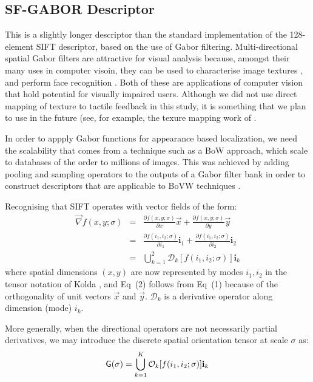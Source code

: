 \subsection{SF-GABOR Descriptor}
This is a slightly longer descriptor than the standard implementation of the 128-element SIFT descriptor, based on the use of Gabor filtering.  Multi-directional spatial Gabor filters are attractive for visual analysis because, amongst their many uses in computer visoin, they can be used to characterise image textures \citep{jain1990unsupervised,weldon1996efficient,adi2009texture}, and perform face recognition \citep{yang2013gabor}. Both of these are applications of computer vision that hold potential for visually impaired users. Although we did not use direct mapping of texture to tactile feedback in this study, it is something that we plan to use in the future (see, for example, the texure mapping work of \cite{adi2009texture}. 

In order to appply Gabor functions for appearance based localization, we need the scalability that comes from a technique such as a BoW approach, which scale to databases of the order to millions of images. This was achieved by adding pooling and sampling operators to the outputs of a Gabor filter bank in order to construct descriptors that are applicable to BoVW techniques \citep{nister2006scalable}.  

Recognising that SIFT operates with vector fields of the form:
\begin{eqnarray}
\vec{\nabla} f(x,y;\sigma) &=& \frac{\partial f(x,y;\sigma)}{\partial x}\vec{x} + \frac{\partial f(x,y;\sigma)}{\partial y}\vec{y}\nonumber \\
&=& \frac{\partial f(i_1,i_2;\sigma)}{\partial i_1}\mathbf{i}_1 + \frac{\partial f(i_1,i_2;\sigma)}{\partial i_2}\mathbf{i}_2\\
&=& \bigcup_{k=1}^2 \mathcal{D}_k [ f(i_1,i_2;\sigma) ] \mathbf{i}_k 
\end{eqnarray}
where spatial dimensions $(x,y)$ are now represented by modes $i_1,i_2$ in the tensor notation of Kolda \citep{kolda2009tensor}, and Eq~(2) follows from Eq~(1) because of the orthogonality of unit vectors $\vec{x}$ and $\vec{y}$.  $\mathcal{D}_k$ is a derivative operator along dimension (mode) $i_k$. 

More generally, when the directional operators are not necessarily partial derivatives, we may introduce the discrete spatial orientation tensor at scale $\sigma$ as:
\begin{equation}
\mathsf{G(\sigma)}  = \bigcup_{k=1}^K \mathcal{O}_k [ f(i_1,i_2;\sigma) ] \mathbf{i}_k 
\label{eq:IntroG}
\end{equation}

